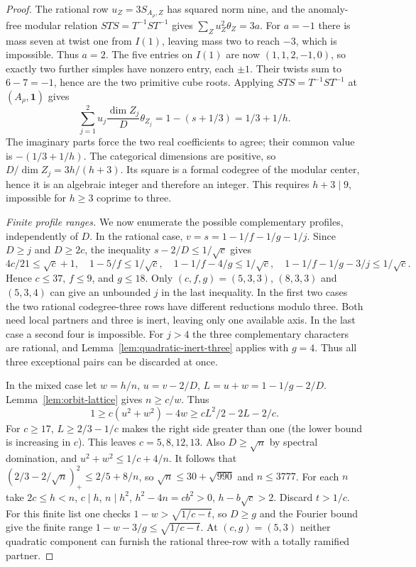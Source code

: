 \documentclass[11pt,a4paper]{article}
\numberwithin{equation}{section}
\begin{document}
\begin{proof}
The rational row $u_Z=3S_{A_\rho,Z}$ has squared norm nine, and the
anomaly-free modular relation $STS=T^{-1}ST^{-1}$ gives
$\sum_Z u_Z^2\theta_Z=3a$. For $a=-1$ there is mass seven at twist
one from $I(1)$, leaving mass two to reach $-3$, which is impossible.
Thus $a=2$. The five entries on $I(1)$ are now $(1,1,2,-1,0)$, so
exactly two further simples have nonzero entry, each $\pm1$.
Their twists sum to $6-7=-1$, hence are the two primitive cube roots.
Applying $STS=T^{-1}ST^{-1}$ at $(A_\rho,\mathbf1)$ gives
\[
 \sum_{j=1}^2 u_j\frac{\dim Z_j}{D}\theta_{Z_j}
       =1-(s+1/3)=1/3+1/h .
\]
The imaginary parts force the two real coefficients to agree; their
common value is $-(1/3+1/h)$. The categorical dimensions are positive,
so $D/\dim Z_j=3h/(h+3)$.
Its square is a formal codegree of the modular center, hence it is
an algebraic integer and therefore an integer. This requires
$h+3\mid9$, impossible for $h\ge3$ coprime to three.

\par\smallskip\noindent\emph{Finite profile ranges.}\enspace
We now enumerate the possible complementary profiles, independently of
$D$. In the rational case, $v=s=1-1/f-1/g-1/j$. Since $D\ge j$ and
$D\ge2c$, the inequality $s-2/D\le 1/\sqrt c$ gives
\[
 4c/21\le\sqrt c+1,\quad
 1-5/f\le1/\sqrt c,\quad 1-1/f-4/g\le1/\sqrt c,\quad
 1-1/f-1/g-3/j\le1/\sqrt c.
\]
Hence $c\le37$, $f\le9$, and $g\le18$. Only $(c,f,g)=(5,3,3)$,
$(8,3,3)$ and $(5,3,4)$ can give an unbounded $j$ in the last
inequality. In the first two cases the two rational codegree-three
rows have different reductions modulo three. Both need local partners
and three is inert, leaving only one available axis. In the last case a second four is impossible. For $j>4$ the three
complementary characters are rational, and
Lemma~\ref{lem:quadratic-inert-three} applies with $g=4$.
Thus all three exceptional pairs can be discarded at once.

In the mixed case let $w=h/n$, $u=v-2/D$, $L=u+w=1-1/g-2/D$.
Lemma~\ref{lem:orbit-lattice} gives $n\ge c/w$. Thus
\[
 1\ge c(u^2+w^2)-4w\ge cL^2/2-2L-2/c .
\]
For $c\ge17$, $L\ge2/3-1/c$ makes the right side greater than one
(the lower bound is increasing in $c$). This leaves $c=5,8,12,13$.
Also $D\ge\sqrt n$ by spectral domination, and $u^2+w^2\le1/c+4/n$.
It follows that $(2/3-2/\sqrt n)_+^2\le2/5+8/n$, so
$\sqrt n\le30+\sqrt{990}$ and $n\le3777$.
For each $n$ take $2c\le h<n$, $c\mid h$, $n\mid h^2$,
$h^2-4n=cb^2>0$, $h-b\sqrt c>2$.
Discard $t>1/c$. For this finite list one checks
$1-w>\sqrt{1/c-t}$, so $D\ge g$ and the Fourier bound give the finite
range $1-w-3/g\le\sqrt{1/c-t}$. At $(c,g)=(5,3)$ neither quadratic
component can furnish the rational three-row with a totally ramified
partner.


\end{proof}
\end{document}
